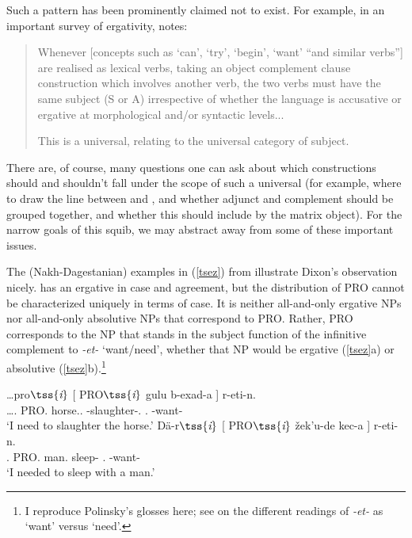 \documentclass[output=paper]{langsci/langscibook}
\begin{document}
\ea \label{abscntr} 	\nobreak\begin{xlista}
	\end{xlista}
\z

Such a pattern has been prominently claimed not to exist. For example, in an
important survey of ergativity, \citet[134--135]{Dixon1994} notes:

\begin{quote} Whenever [concepts such as `can', `try', `begin', `want' ``and
    similar verbs''] are realised as lexical verbs, taking an object complement
    clause construction which involves another verb, the two verbs must have
    the same subject (S or A) irrespective of whether the language is
    accusative or ergative at morphological and/or syntactic levels...

    This is a universal, relating to the universal category of subject.
\end{quote}

There are, of course, many questions one can ask about which constructions
should and shouldn't fall under the scope of such a universal (for example,
where to draw the line between  and , and whether adjunct 
and complement  should be grouped together, and whether this should
include  by the matrix object). For the narrow goals of this squib, we
may abstract away from some of these important issues.

The  (Nakh-Dagestanian) examples in (\ref{tsez}) from
\citet[319]{polinsky16} illustrate Dixon's observation nicely.  has an
ergative  in case and agreement, but the distribution of PRO{} cannot
be characterized uniquely in terms of case. It is neither all-and-only
ergative
NPs nor all-and-only absolutive NPs that correspond to PRO. Rather, PRO
corresponds to the NP that stands in the subject function of the infinitive
complement to \emph{-et-} `want/need', whether that NP would be
ergative
(\ref{tsez}a) or absolutive (\ref{tsez}b).\footnote{I reproduce Polinsky's
glosses here; see \citet[319]{polinsky16} on the different readings of
\emph{-et-} as `want' versus `need'.}

\ea \label{tsez} 
	\begin{xlista}
	\ex \gll \ldots pro$\tss{\emph{i}}$ [ PRO$\tss{\emph{i}}$ gulu b-exad-a ] r-eti-n.\\
	\ldots \Fsg.\Lat{} {} PRO.\Erg{} horse.\Abs.\Iii{} \Iii{}-slaughter-.\Inf{} {}.\Iv{} \Iv{}-want-\Nw{}\\
	\glt `I need to slaughter the horse.'
	\ex \gll D\"a-r$\tss{\emph{i}}$ [ PRO$\tss{\emph{i}}$ \v{z}ek'u-de kec-a ] r-eti-n.\\
	\Fsg.\Lat{} {} PRO.\Abs{} man.\Apud{} sleep-\Inf{} {}.\Iv{} \Iv{}-want-\Nw{} \\
	\glt `I needed to sleep with a man.'
	\end{xlista}
\z
\end{document}

